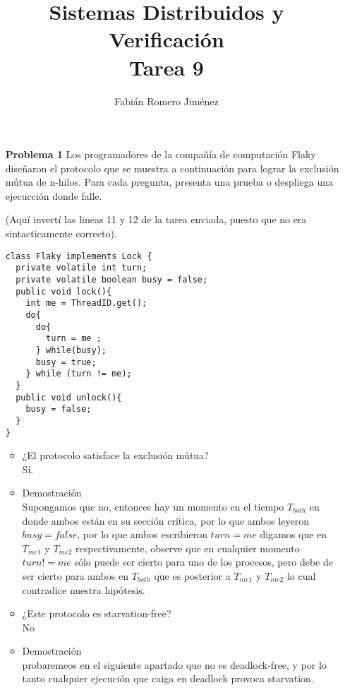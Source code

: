 \documentclass{article}
\title{Sistemas Distribuidos y Verificación \\ Tarea 9}
\author{Fabián Romero Jiménez}
\date{}
\begin{document}
\maketitle

\begin{enumerate}

\item[\bf{Problema 1}] Los programadores de la compañía de computación Flaky diseñaron el
protocolo que se muestra a continuación para lograr la exclusión mútua de n-hilos. 
Para cada pregunta, presenta una prueba o despliega una ejecucción donde falle.

(Aquí invertí las lineas 11 y 12 de la tarea enviada, puesto que no era sintacticamente correcto).

\lstset{numbers=left, stepnumber=1, numbersep=5pt}
\begin{lstlisting}
class Flaky implements Lock {
  private volatile int turn;
  private volatile boolean busy = false;
  public void lock(){
    int me = ThreadID.get();
    do{
      do{ 
        turn = me ;
      } while(busy);
      busy = true;
    } while (turn != me);
  }
  public void unlock(){
    busy = false;
  }
}
\end{lstlisting}


\begin{itemize}
\item ¿El protocolo satisface la exclusión mútua?\\

Sí.
\item Demostración\\
Supongamos que no, entonces hay un momento en el tiempo $T_{both}$ en donde ambos están en su sección crítica, por lo que ambos leyeron $busy=false$, por lo que ambos escribieron $turn=me$ digamos que en  $T_{me1}$ y $T_{me2}$ respectivamente, observe que en cualquier momento $turn!=me$ sólo puede ser cierto para uno de los procesos, pero debe de ser cierto para ambos en $T_{both}$ que es posterior a  $T_{me1}$ y $T_{me2}$ lo cual contradice nuestra hipótesis.

\item ¿Este protocolo es starvation-free?\\
No
\item Demostración\\
 probaremeos en el siguiente apartado que no es deadlock-free, y por lo tanto cualquier ejecución que caiga en deadlock provoca starvation.


\end{itemize}
\end{enumerate}
\end{document}
